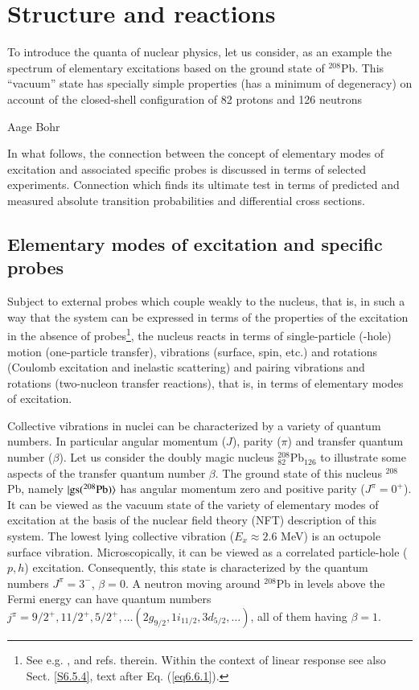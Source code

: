 \chapter{Structure and reactions}\label{intro}
\epigraph{To introduce the quanta of nuclear physics, let us consider, as an example the spectrum of elementary excitations based on the ground state of $^{208}$Pb. This ``vacuum'' state has specially simple properties (has a minimum of degeneracy) on account of the closed-shell configuration of 82 protons and 126 neutrons}{Aage Bohr}
In what follows, the connection between the concept of elementary modes of excitation and associated specific probes is discussed in terms of selected experiments. Connection which finds its ultimate test in terms of predicted and measured absolute transition probabilities and differential cross sections. 
 \section{Elementary modes of excitation and specific probes}\label{S1.1}
Subject to external probes which couple weakly to the nucleus, that is, in such a way that the system can be expressed in terms of the properties of the excitation in the absence of probes\footnote{\label{f1C2} See e.g. \cite{Pines:66},\cite{Bohr:75} and refs. therein. Within the context of linear response  see also Sect. \ref{S6.5.4}, text after Eq. (\ref{eq6.6.1}).}, the nucleus reacts  in terms  of single-particle (-hole) motion (one-particle transfer), vibrations (surface, spin, etc.) and rotations (Coulomb excitation and inelastic scattering) and pairing vibrations and rotations (two-nucleon transfer reactions), that is, in terms of elementary modes of excitation.


Collective vibrations in nuclei can be characterized by a variety of quantum numbers. In particular angular momentum ($J$), parity ($\pi$) and transfer quantum number ($\beta$). Let us consider the doubly magic nucleus $^{208}_{82}$Pb$_{126}$ to illustrate some aspects of the transfer quantum number $\beta$. The ground state of this nucleus $^{208}$Pb, namely $|{\text{gs}(^{208}\text{Pb})} \rangle$ has angular momentum zero and positive parity ($J^\pi=0^+$). It can be viewed as the vacuum state of the variety of elementary modes of excitation at the basis of the nuclear field theory (NFT) description of this system. The lowest lying collective vibration ($E_x\approx2.6$ MeV) is an octupole surface vibration. Microscopically, it can be viewed as a correlated particle-hole ($p,h$) excitation. Consequently, this state is characterized by the quantum numbers $J^\pi=3^-$, $\beta=0$. A neutron moving around $^{208}$Pb in levels above the Fermi energy can have quantum numbers $j^\pi=9/2^+,11/2^+,5/2^+,\dots(2g_{9/2},1i_{11/2},3d_{5/2},\dots)$, all of them having  $\beta=1$.


